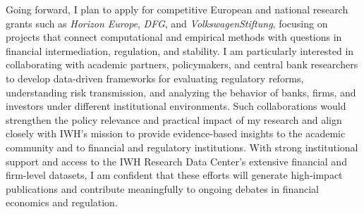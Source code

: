 \documentclass{nfr}
\begin{document}

Going forward, I plan to apply for competitive European and national research grants such as \textit{Horizon Europe}, \textit{DFG}, and \textit{VolkswagenStiftung}, focusing on projects that connect computational and empirical methods with questions in financial intermediation, regulation, and stability. 
I am particularly interested in collaborating with academic partners, policymakers, and central bank researchers to develop data-driven frameworks for evaluating regulatory reforms, understanding risk transmission, and analyzing the behavior of banks, firms, and investors under different institutional environments. 
Such collaborations would strengthen the policy relevance and practical impact of my research and align closely with IWH’s mission to provide evidence-based insights to the academic community and to financial and regulatory institutions. 
With strong institutional support and access to the IWH Research Data Center’s extensive financial and firm-level datasets, I am confident that these efforts will generate high-impact publications and contribute meaningfully to ongoing debates in financial economics and regulation.\\
\end{document}
